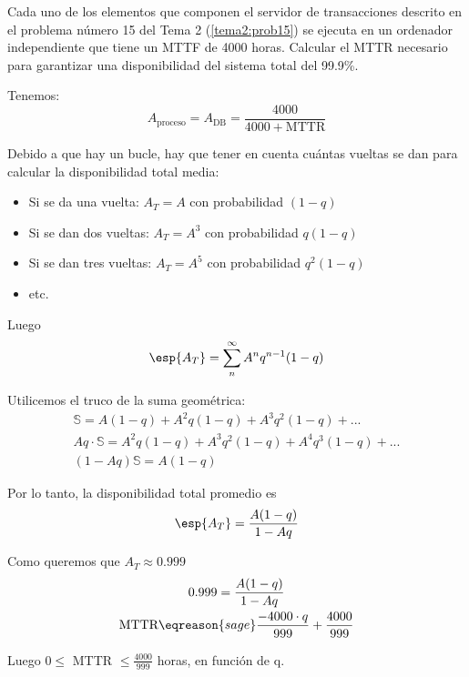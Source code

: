 \newpage
\begin{problem}[8]
Cada uno de los elementos que componen el servidor de transacciones descrito en el problema número 15 del Tema 2 (\ref{tema2:prob15}) se ejecuta en un ordenador independiente que tiene un MTTF de 4000 horas. Calcular el MTTR necesario para garantizar una disponibilidad del sistema total del 99.9\%.

\solution

Tenemos:
\[ A_{\text{proceso}} = A_{\text{DB}} = \frac{4000}{4000+\text{MTTR}}\]

Debido a que hay un bucle, hay que tener en cuenta cuántas vueltas se dan para calcular la disponibilidad total media:
\begin{itemize}
	\item Si se da una vuelta: $A_T = A$ con probabilidad $(1-q)$
	\item Si se dan dos vueltas: $A_T = A^3$ con probabilidad $q(1-q)$
	\item Si se dan tres vueltas: $A_T = A^5$ con probabilidad $q^2(1-q)$
	\item etc.
\end{itemize}

Luego
\[ \esp{A_T} = \sum\limits_{n}^{\infty} A^{n} q^{n-1}(1-q) \]

Utilicemos el truco de la suma geométrica:
\begin{gather*}
\mathbb{S} = A(1-q) + A^{2} q(1-q) + A^{3} q^{2}(1-q) + ...\\
Aq \cdot \mathbb{S} = A^{2} q(1-q) + A^{3} q^{2}(1-q) + A^{4} q^{3}(1-q) + ...\\
(1-Aq)\mathbb{S} = A(1-q)
\end{gather*}

Por lo tanto, la disponibilidad total promedio es
\[ \esp{A_T} = \frac{A(1 - q)}{1 - A q} \]

Como queremos que $A_T \approx 0.999$
\begin{gather*}
0.999 = \frac{A(1 - q)}{1 - A q}\\
\text{MTTR} \eqreason{sage} \frac{-4000 \cdot q}{999} + \frac{4000}{999}
\end{gather*}

Luego $0 \leq$ MTTR $\leq \frac{4000}{999}$ horas, en función de q.

\end{problem}

